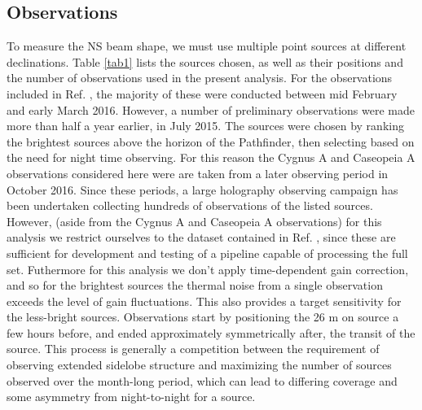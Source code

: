 \subsection{Observations} \label{ch:hol:sec:io:ss:o}

To measure the NS beam shape, we must use multiple point sources at different declinations. Table \ref{tab1} lists the sources chosen, as well as their positions and the number of observations used in the present analysis. For the observations included in Ref. \citep{bergernewburgh}, the majority of these were conducted between mid February and early March 2016. However, a number of preliminary observations were made more than half a year earlier, in July 2015. The sources were chosen by ranking the brightest sources above the horizon of the Pathfinder, then selecting based on the need for night time observing. For this reason the Cygnus A and Caseopeia A observations considered here were are taken from a later observing period in October 2016. Since these periods, a large holography observing campaign has been undertaken collecting hundreds of observations of the listed sources. However, (aside from the Cygnus A and Caseopeia A observations) for this analysis we restrict ourselves to the dataset contained in Ref. \citep{bergernewburgh}, since these are sufficient for development and testing of a pipeline capable of processing the full set. Futhermore for this analysis we don't apply time-dependent gain correction, and so for the brightest sources the thermal noise from a single observation exceeds the level of gain fluctuations. This also provides a target sensitivity for the less-bright sources. Observations start by positioning the 26 m on source a few hours before, and ended approximately symmetrically after, the transit of the source. This process is generally a competition between the requirement of observing extended sidelobe structure and maximizing the number of sources observed over the month-long period, which can lead to differing coverage and some asymmetry from night-to-night for a source.

